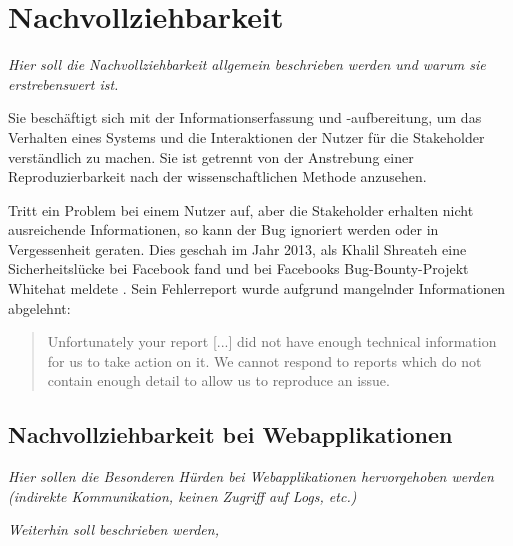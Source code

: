\newpage



\newpage

\section{Nachvollziehbarkeit}

	\textit{Hier soll die Nachvollziehbarkeit allgemein beschrieben werden und warum sie erstrebenswert ist.}

	Sie beschäftigt sich mit der Informationserfassung und -aufbereitung, um das Verhalten eines Systems und die Interaktionen der Nutzer für die Stakeholder verständlich zu machen. Sie ist getrennt von der Anstrebung einer Reproduzierbarkeit nach der wissenschaftlichen Methode anzusehen.
	
	{\color{red}\textit{\lipsum[1]}}
	
	Tritt ein Problem bei einem Nutzer auf, aber die Stakeholder erhalten nicht ausreichende Informationen, so kann der Bug ignoriert werden oder in Vergessenheit geraten. Dies geschah im Jahr 2013, als Khalil Shreateh eine Sicherheitslücke bei Facebook fand und bei Facebooks Bug-Bounty-Projekt Whitehat meldete \cite{FacebookBugBounyHunt}. Sein Fehlerreport wurde aufgrund mangelnder Informationen abgelehnt:
	
	\begin{quotation}
	Unfortunately your report [...] did not have enough technical information for us to take action  on  it. We  cannot  respond  to  reports  which  do  not contain enough detail to allow us to reproduce an issue.
	\end{quotation}

\subsection{Nachvollziehbarkeit bei Webapplikationen}

	\textit{Hier sollen die Besonderen Hürden bei Webapplikationen hervorgehoben werden (indirekte Kommunikation, keinen Zugriff auf Logs, etc.)}

	\textit{Weiterhin soll beschrieben werden, }